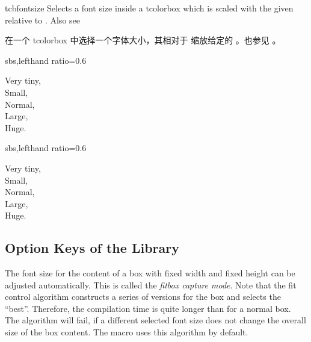 \begin{docCommand}{tcbfontsize}{}
Selects a font size inside a tcolorbox which is scaled with the given
 relative to .
Also see 

在一个 tcolorbox 中选择一个字体大小，其相对于  缩放给定的 。也参见 。
\begin{dispExample*}{sbs,lefthand ratio=0.6}
\begin{tcolorbox}[fit basedim=10pt]
  { Very tiny,}\\
  { Small,}\\
  { Normal,}\\
  { Large,}\\
  { Huge.}
\end{tcolorbox}
\end{dispExample*}
\begin{dispExample*}{sbs,lefthand ratio=0.6}
\begin{tcolorbox}[fit basedim=10pt,
    fit to height=2cm]
  { Very tiny,}\\
  { Small,}\\
  { Normal,}\\
  { Large,}\\
  { Huge.}
\end{tcolorbox}
\end{dispExample*}
\end{docCommand}


%  
\subsection{Option Keys of the Library\\}\label{subsec:fit}

The font size for the content of a box with fixed width and fixed height
can be adjusted automatically. This is called the \emph{fitbox capture mode}.
Note that the fit control algorithm
constructs a series of versions for the box and selects the \enquote{best}.
Therefore, the compilation time is quite longer than for a normal box.
The algorithm will fail, if a different selected font size does not change the
overall size of the box content.
The  macro uses this algorithm by default.

